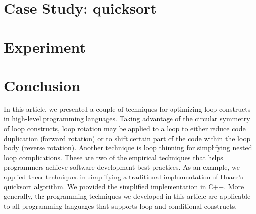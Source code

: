 \documentclass[a4paper,titlepage]{article}
\begin{document}
    \section{Case Study: quicksort}\label{sec:nested-loop-quick-sort}
    

    \section{Experiment}\label{sec:experiment}
    

    \section{Conclusion}\label{sec:conclusion}
    In this article, we presented a couple of techniques for optimizing loop constructs in
    high-level programming languages.
    Taking advantage of the circular symmetry of loop constructs, loop rotation may be applied to a
    loop to either reduce code duplication (forward rotation) or to shift certain part of the
    code within the loop body (reverse rotation).
    Another technique is loop thinning for simplifying nested loop complications.
    These are two of the empirical techniques that helps programmers achieve software development
    best practices.
    As an example, we applied these techniques in simplifying a traditional implementation of
    Hoare's quicksort algorithm.
    We provided the simplified implementation in C++.
    More generally, the programming techniques we developed in this article are applicable to all
    programming languages that supports loop and conditional constructs.
    \begin{appendices}
        \appendix
        
        
    \end{appendices}
    
    
\end{document}
